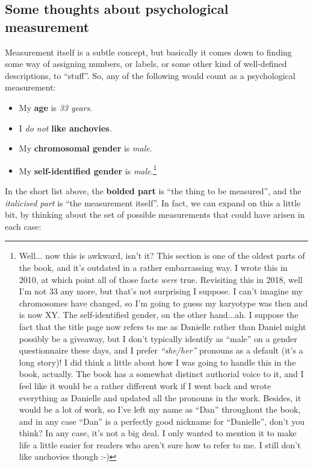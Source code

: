 \subsection{Some thoughts about psychological measurement}

Measurement itself is a subtle concept, but basically it comes down to finding some way of assigning numbers, or labels, or some other kind of well-defined descriptions, to ``stuff''. So, any of the following would count as a psychological measurement:

\begin{itemize} \itemsep 0pt
\item My {\bf age} is {\it 33 years}.
\item I {\it do not} {\bf like anchovies}.
\item My {\bf chromosomal gender} is {\it male}. 
\item My {\bf self-identified gender} is {\it male}.\footnote{Well... now this is awkward, isn't it? This section is one of the oldest parts of the book, and it's outdated in a rather embarrassing way. I wrote this in 2010, at which point all of those facts {\it were} true. Revisiting this in 2018, well I'm not 33 any more, but that's not surprising I suppose. I can't imagine my chromosomes have changed, so I'm going to guess my karyotype was then and is now XY. The self-identified gender, on the other hand...ah. I suppose the fact that the title page now refers to me as Danielle rather than Daniel might possibly be a giveaway, but I don't typically identify as ``male'' on a gender questionnaire these days, and I prefer {\it ``she/her''} pronouns as a default (it's a long story)!  I did think a little about how I was going to handle this in the book, actually. The book has a somewhat distinct authorial voice to it, and I feel like it would be a rather different work if I went back and wrote everything as Danielle and updated all the pronouns in the work. Besides, it would be a lot of work, so I've left my name as  ``Dan'' throughout the book, and in any case ``Dan'' is a perfectly good nickname for ``Danielle'', don't you think? In any case, it's not a big deal. I only wanted to mention it to make life a little easier for readers who aren't sure how to refer to me. I still don't like anchovies though :-)} 
\end{itemize}

In the short list above, the {\bf  bolded part} is ``the thing to be measured'', and the {\it italicised part} is ``the measurement itself''. In fact, we can expand on this a little bit, by thinking about the set of possible measurements that could have arisen in each case:

